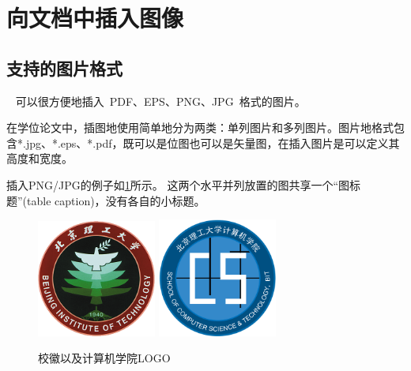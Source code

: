 \section{向文档中插入图像}
\label{sec:insertimage}

\subsection{支持的图片格式}
\label{sec:imageformat}

\XeTeX~ 可以很方便地插入~PDF、EPS、PNG、JPG~格式的图片。

在学位论文中，插图地使用简单地分为两类：单列图片和多列图片。图片地格式包含*.jpg、*.eps、*.pdf，既可以是位图也可以是矢量图，在插入图片是可以定义其高度和宽度。

插入PNG/JPG的例子如\ref{fig:png-jpg}所示。
这两个水平并列放置的图共享一个``图标题''(table caption)，没有各自的小标题。

\begin{figure}[!htp]
  \centering
  \includegraphics[width=0.35\textwidth]{figures/BIT}
  \hspace{1cm}
  \includegraphics[width=0.35\textwidth]{figures/BIT-CS}
  \caption{校徽以及计算机学院LOGO}
  \label{fig:png-jpg}
\end{figure}

